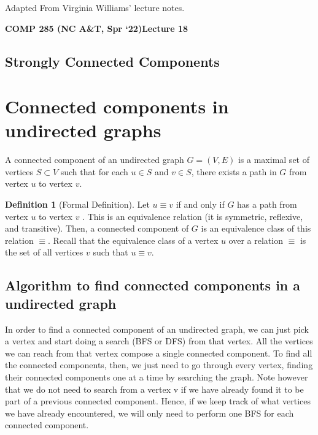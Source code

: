 \documentclass [12pt]{article}
\theoremstyle{definition}
\newtheorem{definition}{Definition}[section]
\begin{document}
 

\vspace {1em} 
\begin {Instruction} 
Adapted From Virginia Williams' lecture notes.
\end {Instruction}  

{\LARGE \textbf {COMP 285 (NC A\&T, Spr `22)}\hfill \textbf {Lecture 18} } 

\begin{centering}
\section*{Strongly Connected Components}
\end{centering}
 
 \section{Connected components in undirected graphs} 

 A connected component of an undirected graph $ G = (V, E)$ is a maximal set of vertices $S \subset V$ such that for each $u \in S$ and $v \in S$, there exists a path in $G$ from vertex $u$ to vertex $v$.

\begin{definition}[Formal Definition]
Let $u \equiv v$ if and only if $G$ has a path from vertex $u$ to vertex $v$ . This is an equivalence relation (it is symmetric, reflexive, and transitive). Then, a connected component of $G$ is an equivalence class of this relation $\equiv$. Recall that the equivalence class of a vertex $u$ over a relation $\equiv$ is the set of all vertices $v$ such that $u \equiv v$.
\end{definition}

 \subsection{Algorithm to find connected components in a undirected graph}

In order to find a connected component of an undirected graph, we can just pick a vertex and start doing a search (BFS or DFS) from that vertex. All the vertices we can reach from that vertex compose a single connected component. To find all the connected components, then, we just need to go through every vertex, finding their connected components one at a time by searching the graph. Note however that we do not need to search from a vertex v if we have already found it to be part of a previous connected component. Hence, if we keep track of what vertices we have already encountered, we will only need to perform one BFS for each connected component.
\end{document}
